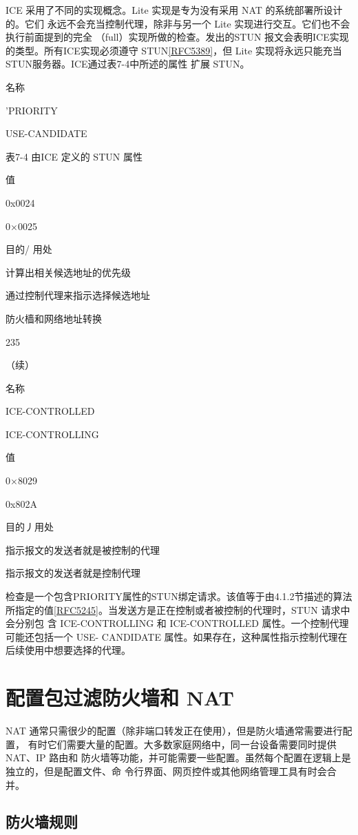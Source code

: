 ICE 采用了不同的实现概念。Lite 实现是专为没有采用 NAT 的系统部署所设计的。它们
永远不会充当控制代理，除非与另一个 Lite 实现进行交互。它们也不会执行前面提到的完全
（full）实现所做的检查。发出的STUN 报文会表明ICE实现的类型。所有ICE实现必须遵守
STUN\href{https://www.rfc-editor.org/rfc/rfc5389}{[RFC5389]}，但 Lite
实现将永远只能充当STUN服务器。ICE通过表7-4中所述的属性
扩展 STUN。

名称

'PRIORITY

USE-CANDIDATE

表7-4 由ICE 定义的 STUN 属性

值

0x0024

0×0025

目的/ 用处

计算出相关候选地址的优先级

通过控制代理来指示选择候选地址

防火樯和网络地址转换

235

（续）

名称

ICE-CONTROLLED

ICE-CONTROLLING

值

0×8029

0x802A

目的丿用处

指示报文的发送者就是被控制的代理

指示报文的发送者就是控制代理

检查是一个包含PRIORITY属性的STUN绑定请求。该值等于由4.1.2节描述的算法
所指定的值\href{https://www.rfc-editor.org/rfc/rfc5245}{[RFC5245]}。当发送方是正在控制或者被控制的代理时，STUN
请求中会分别包
含 ICE-CONTROLLING 和 ICE-CONTROLLED 属性。一个控制代理可能还包括一个 USE-
CANDIDATE 属性。如果存在，这种属性指示控制代理在后续使用中想要选择的代理。

\section{配置包过滤防火墙和 NAT}

NAT 通常只需很少的配置（除非端口转发正在使用），但是防火墙通常需要进行配置，
有时它们需要大量的配置。大多数家庭网络中，同一台设备需要同时提供NAT、IP 路由和
防火墙等功能，并可能需要一些配置。虽然每个配置在逻辑上是独立的，但是配置文件、命
令行界面、网页控件或其他网络管理工具有时会合并。

\subsection{防火墙规则}

